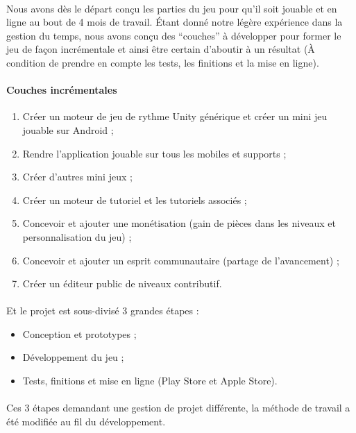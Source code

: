 \paragraph{}
Nous avons dès le départ conçu les parties du jeu pour qu’il soit jouable et en ligne au bout de 4 mois de travail. Étant donné notre légère expérience dans la gestion du temps, nous avons conçu des “couches” à développer pour former le jeu de façon incrémentale et ainsi être certain d’aboutir à un résultat (À condition de prendre en compte les tests, les finitions et la mise en ligne).

\paragraph{Couches incrémentales}
\begin{enumerate}
\item Créer un moteur de jeu de rythme Unity générique et créer un mini jeu jouable sur Android ;
\item Rendre l’application jouable sur tous les mobiles et supports ;
\item Créer d’autres mini jeux ;
\item Créer un moteur de tutoriel et les tutoriels associés ;
\item Concevoir et ajouter une monétisation (gain de pièces dans les niveaux et personnalisation du jeu) ;
\item Concevoir et ajouter un esprit communautaire (partage de l’avancement) ;
\item Créer un éditeur public de niveaux contributif.
\end{enumerate}

\paragraph{}
Et le projet est sous-divisé 3 grandes étapes :
\begin{itemize}
\item Conception et prototypes ;
\item Développement du jeu ;
\item Tests, finitions et mise en ligne (Play Store et Apple Store).
\end{itemize}

\paragraph{}
Ces 3 étapes demandant une gestion de projet différente, la méthode de travail a été modifiée au fil du développement.

